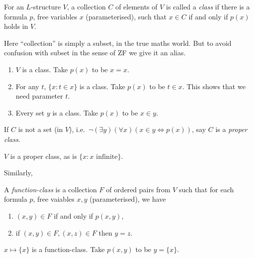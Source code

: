 \documentclass[a4paper]{article}
\begin{document}
\begin{definition}[Class]
  For an \(L\)-structure \(V\), a collection \(C\) of elements of \(V\) is called a \emph{class} if there is a formula \(p\), free variables \(x\) (parameterised), such that \(x \in C\) if and only if \(p(x)\) holds in \(V\).
\end{definition}

Here ``collection'' is simply a subset, in the true maths world. But to avoid confusion with subset in the sense of ZF we give it an alias.

\begin{eg}\leavevmode
  \begin{enumerate}
  \item \(V\) is a class. Take \(p(x)\) to be \(x = x\).
  \item For any \(t\), \(\{x: t \in x\}\) is a class. Take \(p(x)\) to be \(t \in x\). This shows that we need parameter \(t\).
  \item Every set \(y\) is a class. Take \(p(x)\) to be \(x \in y\).
  \end{enumerate}
\end{eg}

\begin{definition}
  If \(C\) is not a set (in \(V\)), i.e.\ \(\neg (\exists y) (\forall x) (x \in y \iff p(x))\), say \(C\) is a \emph{proper class}.
\end{definition}

\begin{eg}
  \(V\) is a proper class, as is \(\{x: x \text{ infinite}\}\).
\end{eg}

Similarly,

\begin{definition}
  A \emph{function-class} is a collection \(F\) of ordered pairs from \(V\) such that for each formula \(p\), free vaiables \(x, y\) (parameterised), we have
  \begin{enumerate}
  \item \((x, y) \in F\) if and only if \(p(x, y)\),
  \item if \((x, y) \in F, (x, z) \in F\) then \(y = z\).
  \end{enumerate}
\end{definition}

\begin{eg}
  \(x \mapsto \{x\}\) is a function-class. Take \(p(x, y)\) to be \(y = \{x\}\).
\end{eg}
\end{document}
